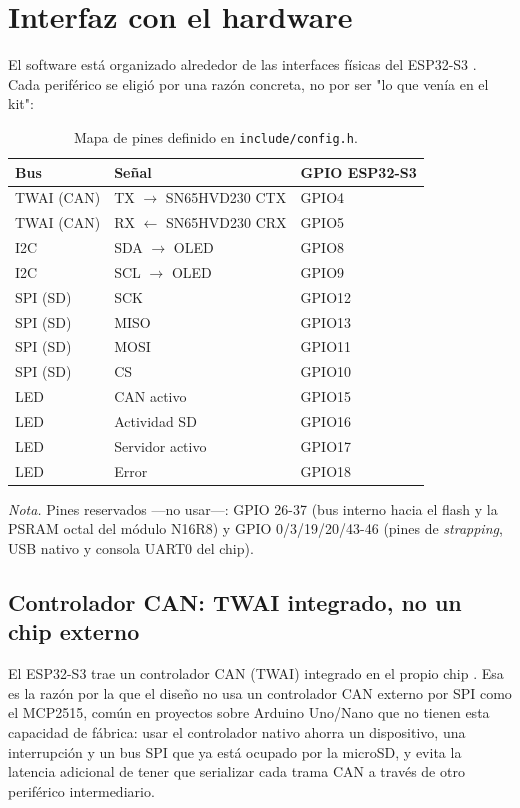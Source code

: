\section{Interfaz con el hardware}

El software está organizado alrededor de las interfaces físicas del
ESP32-S3 \cite{espressif2024datasheet,espressif2024trm}. Cada periférico se
eligió por una razón concreta, no por ser "lo que venía en el kit":

\begin{table}[H]
\centering
\caption{Mapa de pines definido en \texttt{include/config.h}.}
\begin{tabular}{@{}lll@{}}
\toprule
Bus & Señal & GPIO ESP32-S3 \\
\midrule
TWAI (CAN)   & TX $\rightarrow$ SN65HVD230 CTX & GPIO4 \\
TWAI (CAN)   & RX $\leftarrow$ SN65HVD230 CRX  & GPIO5 \\
I2C          & SDA $\rightarrow$ OLED          & GPIO8 \\
I2C          & SCL $\rightarrow$ OLED          & GPIO9 \\
SPI (SD)     & SCK                              & GPIO12 \\
SPI (SD)     & MISO                             & GPIO13 \\
SPI (SD)     & MOSI                             & GPIO11 \\
SPI (SD)     & CS                               & GPIO10 \\
LED          & CAN activo                       & GPIO15 \\
LED          & Actividad SD                     & GPIO16 \\
LED          & Servidor activo                  & GPIO17 \\
LED          & Error                            & GPIO18 \\
\bottomrule
\end{tabular}
\end{table}

\textit{Nota.} Pines reservados —no usar—: GPIO 26-37 (bus interno hacia el
flash y la PSRAM octal del módulo N16R8) y GPIO 0/3/19/20/43-46 (pines de
\textit{strapping}, USB nativo y consola UART0 del chip).

\subsection{Controlador CAN: TWAI integrado, no un chip externo}
El ESP32-S3 trae un controlador CAN (TWAI) integrado en el propio chip
\cite{espressif2024trm}. Esa es la razón por la que el diseño no usa un
controlador CAN externo por SPI como el MCP2515, común en proyectos sobre
Arduino Uno/Nano que no tienen esta capacidad de fábrica: usar el
controlador nativo ahorra un dispositivo, una interrupción y un bus SPI que
ya está ocupado por la microSD, y evita la latencia adicional de tener que
serializar cada trama CAN a través de otro periférico intermediario.

